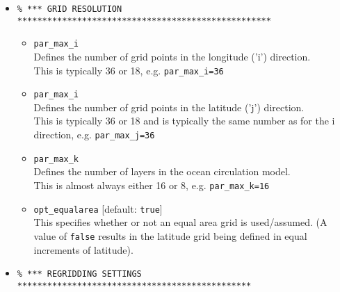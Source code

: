 \documentclass[11pt,fleqn]{book} %
\begin{document}
\begin{itemize}
\vspace{2mm}
\item []
\small\vspace{-2pt}\begin{verbatim}
% *** GRID RESOLUTION ***************************************************
\end{verbatim}\vspace{-2pt}\normalsize

\begin{itemize}[noitemsep]
\vspace{1mm}

\item \texttt{par\_max\_i}
\\Defines the number of grid points in the longitude ('i') direction.
\\This is typically 36 or 18, e.g. \texttt{par\_max\_i=36}

\item \texttt{par\_max\_i}
\\Defines the number of grid points in the latitude ('j') direction.
\\This is typically 36 or 18 and is typically the same number as for the i direction, e.g. \texttt{par\_max\_j=36}

\item \texttt{par\_max\_k}
\\Defines the number of  layers in the ocean circulation model.
\\This is almost always either 16 or 8, e.g. \texttt{par\_max\_k=16}

\item \texttt{opt\_equalarea} [default: \texttt{true}]
\\This specifies whether or not an equal area grid is used/assumed. (A value of \texttt{false} results in the latitude grid being defined in equal increments of latitude).

\end{itemize}

\pagebreak

\vspace{2mm}
\item []
\small\vspace{-2pt}\begin{verbatim}
% *** REGRIDDING SETTINGS ***********************************************
\end{verbatim}\vspace{-2pt}\normalsize

\begin{itemize}[noitemsep]
\vspace{1mm}


\end{itemize}
\end{itemize}
\end{document}
